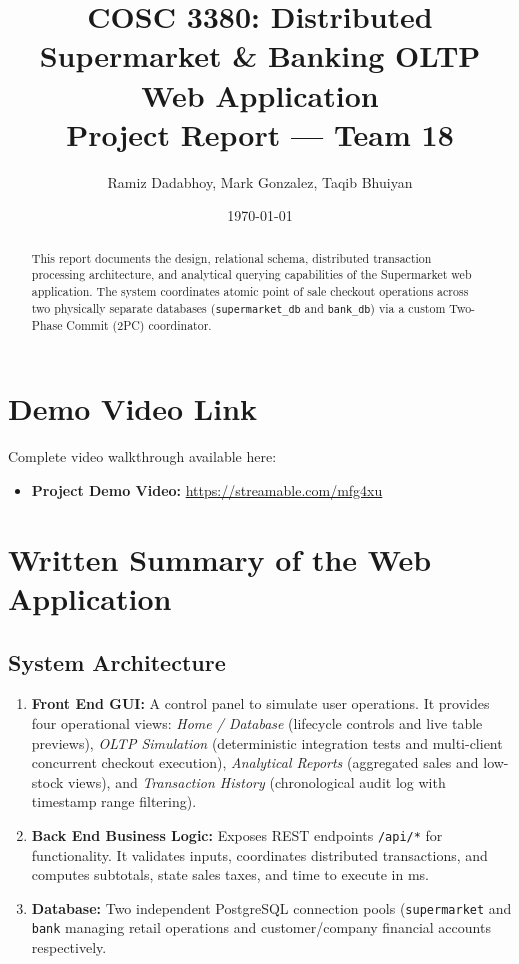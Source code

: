 \documentclass[11pt, a4paper]{article}
\title{\textbf{COSC 3380: Distributed Supermarket \& Banking OLTP Web Application}\\
\large Project Report --- Team 18}
\author{Ramiz Dadabhoy, Mark Gonzalez, Taqib Bhuiyan}
\date{\today}
\begin{document}
\maketitle

\begin{abstract}
This report documents the design, relational schema, distributed transaction processing architecture, and analytical querying capabilities of the Supermarket web application. The system coordinates atomic point of sale checkout operations across two physically separate databases (\texttt{supermarket\_db} and \texttt{bank\_db}) via a custom Two-Phase Commit (2PC) coordinator.
\end{abstract}

\tableofcontents
\newpage

\section{Demo Video Link}
Complete video walkthrough available here:
\begin{itemize}
    \item \textbf{Project Demo Video:} \url{https://streamable.com/mfg4xu}
\end{itemize}

\section{Written Summary of the Web Application}

\subsection{System Architecture}
\begin{enumerate}
    \item \textbf{Front End GUI:} A control panel to simulate user operations. It provides four operational views: \textit{Home / Database} (lifecycle controls and live table previews), \textit{OLTP Simulation} (deterministic integration tests and multi-client concurrent checkout execution), \textit{Analytical Reports} (aggregated sales and low-stock views), and \textit{Transaction History} (chronological audit log with timestamp range filtering).
    \item \textbf{Back End Business Logic:} Exposes REST endpoints \texttt{/api/*} for functionality. It validates inputs, coordinates distributed transactions, and computes subtotals, state sales taxes, and time to execute in ms.
    \item \textbf{Database:} Two independent PostgreSQL connection pools (\texttt{supermarket} and \texttt{bank} managing retail operations and customer/company financial accounts respectively.
\end{enumerate}
\end{document}
